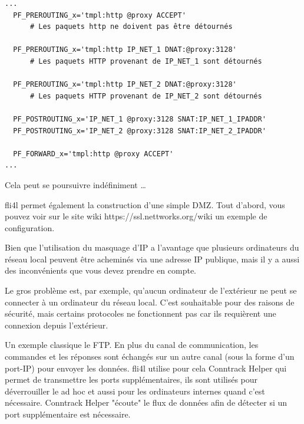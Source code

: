 \begin{example}
\begin{verbatim}
...
  PF_PREROUTING_x='tmpl:http @proxy ACCEPT'
      # Les paquets http ne doivent pas être détournés

  PF_PREROUTING_x='tmpl:http IP_NET_1 DNAT:@proxy:3128'
      # Les paquets HTTP provenant de IP_NET_1 sont détournés

  PF_PREROUTING_x='tmpl:http IP_NET_2 DNAT:@proxy:3128'
      # Les paquets HTTP provenant de IP_NET_2 sont détournés

  PF_POSTROUTING_x='IP_NET_1 @proxy:3128 SNAT:IP_NET_1_IPADDR'
  PF_POSTROUTING_x='IP_NET_2 @proxy:3128 SNAT:IP_NET_2_IPADDR'

  PF_FORWARD_x='tmpl:http @proxy ACCEPT'
...
\end{verbatim}
\end{example}

Cela peut se poursuivre indéfiniment \ldots


fli4l permet également la construction d'une simple DMZ. Tout d'abord, vous
pouvez voir sur le site wiki https://ssl.nettworks.org/wiki un exemple de
configuration.


  Bien que l'utilisation du masquage d'IP  a l'avantage
  que plusieurs ordinateurs du réseau local peuvent être acheminés via
  une adresse IP publique, mais il y a aussi des inconvénients que vous devez
  prendre en compte.

  Le gros problème est, par exemple, qu'aucun ordinateur de l'extérieur ne peut
  se connecter à un ordinateur du réseau local. C'est souhaitable pour des
  raisons de sécurité, mais certains protocoles ne fonctionnent pas car ils
  requièrent une connexion depuis l'extérieur.

  Un exemple classique le FTP. En plus du canal de communication, les commandes
  et les réponses sont échangés sur un autre canal (sous la forme d'un port-IP)
  pour envoyer les données. fli4l utilise pour cela Conntrack Helper
  qui permet de transmettre les ports supplémentaires, ils sont utilisés pour
  déverrouiller le ad hoc et aussi pour les ordinateurs internes quand c'est
  nécessaire. Conntrack Helper "écoute" le flux de données afin de détecter
  si un port supplémentaire est nécessaire.

